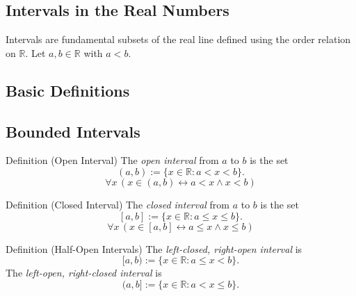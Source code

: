 
\subsection{Intervals in the Real Numbers}

\begin{exposition}
Intervals are fundamental subsets of the real line defined using the order
relation on $\mathbb{R}$. Let $a,b \in \mathbb{R}$ with $a < b$.
\end{exposition}

\subsection*{Basic Definitions}

\subsection*{Bounded Intervals}

\begin{definitionbox}{Definition (Open Interval)}
The \emph{open interval} from $a$ to $b$ is the set
\[
(a,b) := \{ x \in \mathbb{R} : a < x < b \}.
\]
\[
\forall x \, (x \in (a,b) \leftrightarrow a < x \wedge x < b)
\]
\end{definitionbox}
\label{def:open-interval-R}

\begin{definitionbox}{Definition (Closed Interval)}
The \emph{closed interval} from $a$ to $b$ is the set
\[
[a,b] := \{ x \in \mathbb{R} : a \le x \le b \}.
\]
\[
\forall x \, (x \in [a,b] \leftrightarrow a \le x \wedge x \le b)
\]
\end{definitionbox}
\label{def:closed-interval-R}

\begin{definitionbox}{Definition (Half-Open Intervals)}
The \emph{left-closed, right-open interval} is
\[
[a,b) := \{ x \in \mathbb{R} : a \le x < b \}.
\]
The \emph{left-open, right-closed interval} is
\[
(a,b] := \{ x \in \mathbb{R} : a < x \le b \}.
\]
\end{definitionbox}

